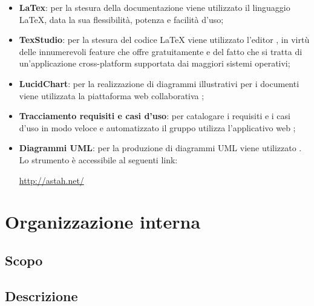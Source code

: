 \documentclass[openany,12pt,a4paper]{report}
\begin{document}
\begin{itemize}
    \item \textbf{LaTex}: per la stesura della documentazione viene utilizzato il linguaggio \LaTeX{}, data la sua flessibilità, potenza e facilità d'uso;
    
    \item \textbf{TexStudio}: per la stesura del codice \LaTeX{} viene utilizzato l’editor , in virtù delle innumerevoli feature che offre gratuitamente e del fatto che si tratta di un'applicazione cross-platform supportata dai maggiori sistemi operativi;
    
    \item \textbf{LucidChart}: per la realizzazione di diagrammi illustrativi per i documenti viene utilizzata la piattaforma web collaborativa ;
    	
    \item \textbf{Tracciamento requisiti e casi d'uso}: per catalogare i requisiti e i casi d'uso in modo veloce e automatizzato il gruppo utilizza l'applicativo web ;
	
	\item \textbf{Diagrammi UML}: per la produzione di diagrammi UML viene utilizzato . Lo strumento è accessibile al seguenti link: \\ \centerline{\url{http://astah.net/}}	
\end{itemize}


\chapter{Organizzazione interna}

\section{Scopo}

\section{Descrizione}
	
\end{document}
